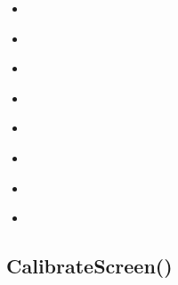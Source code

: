 \documentclass[letterpaper,10pt,english]{sphinxmanual}
\begin{document}
\begin{sphinxShadowBox}
\begin{itemize}
\item {} 
\sphinxAtStartPar
{}\label{\detokenize{reference/utility:id54}}{\hyperref[\detokenize{reference/utility:readtranslation}]{}}

\item {} 
\sphinxAtStartPar
{}\label{\detokenize{reference/utility:id55}}{\hyperref[\detokenize{reference/utility:readtranslationjson}]{}}

\item {} 
\sphinxAtStartPar
{}\label{\detokenize{reference/utility:id56}}{\hyperref[\detokenize{reference/utility:substitutestrings}]{}}

\item {} 
\sphinxAtStartPar
{}\label{\detokenize{reference/utility:id57}}{\hyperref[\detokenize{reference/utility:syncdatafile}]{}}

\item {} 
\sphinxAtStartPar
{}\label{\detokenize{reference/utility:id58}}{\hyperref[\detokenize{reference/utility:uploadfile}]{}}

\item {} 
\sphinxAtStartPar
{}\label{\detokenize{reference/utility:id59}}{\hyperref[\detokenize{reference/utility:clickon}]{}}

\item {} 
\sphinxAtStartPar
{}\label{\detokenize{reference/utility:id60}}{\hyperref[\detokenize{reference/utility:countdown}]{}}

\item {} 
\sphinxAtStartPar
{}\label{\detokenize{reference/utility:id61}}{\hyperref[\detokenize{reference/utility:getinput}]{}}

\end{itemize}
\end{sphinxShadowBox}

\ignorespaces 

\subsection{CalibrateScreen()}
\label{\detokenize{reference/utility:calibratescreen}}\label{\detokenize{reference/utility:index-0}}
\sphinxAtStartPar
{}
\end{document}
